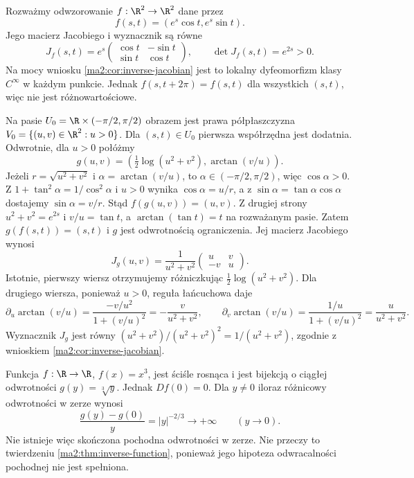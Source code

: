 \begin{przyklad}
\label{ma2:ex:inverse-polar-exponential}
Rozważmy odwzorowanie $f:\R^2\to\R^2$ dane przez
\[
 f(s,t)=(e^s\cos t,e^s\sin t).
\]
Jego macierz Jacobiego i wyznacznik są równe
\[
 J_f(s,t)=e^s
 \begin{pmatrix}\cos t&-\sin t\\\sin t&\cos t\end{pmatrix},
 \qquad \det J_f(s,t)=e^{2s}>0.
\]
Na mocy wniosku \ref{ma2:cor:inverse-jacobian}
jest to lokalny dyfeomorfizm klasy $C^\infty$
w każdym punkcie. Jednak $f(s,t+2\pi)=f(s,t)$
dla wszystkich $(s,t)$, więc nie jest różnowartościowe.

Na pasie $U_0=\R\times(-\pi/2,\pi/2)$ obrazem jest
prawa półpłaszczyzna $V_0=\{(u,v)\in\R^2:u>0\}$.
Dla $(s,t)\in U_0$ pierwsza współrzędna jest dodatnia.
Odwrotnie, dla $u>0$ połóżmy
\[
 g(u,v)=
 \left(\tfrac12\log(u^2+v^2),\arctan(v/u)\right).
\]
Jeżeli $r=\sqrt{u^2+v^2}$ i $\alpha=\arctan(v/u)$,
to $\alpha\in(-\pi/2,\pi/2)$, więc $\cos\alpha>0$.
Z $1+\tan^2\alpha=1/\cos^2\alpha$ i $u>0$ wynika
$\cos\alpha=u/r$, a z $\sin\alpha=\tan\alpha\cos\alpha$
dostajemy $\sin\alpha=v/r$.
Stąd $f(g(u,v))=(u,v)$.
Z drugiej strony $u^2+v^2=e^{2s}$ i $v/u=\tan t$,
a $\arctan(\tan t)=t$ na rozważanym pasie.
Zatem $g(f(s,t))=(s,t)$ i $g$ jest odwrotnością
ograniczenia. Jej macierz Jacobiego wynosi
\[
 J_g(u,v)=\frac{1}{u^2+v^2}
 \begin{pmatrix}u&v\\-v&u\end{pmatrix}.
\]
Istotnie, pierwszy wiersz otrzymujemy różniczkując
$\tfrac12\log(u^2+v^2)$. Dla drugiego wiersza, ponieważ
$u>0$, reguła łańcuchowa daje
\[
 \partial_u\arctan(v/u)=
 \frac{-v/u^2}{1+(v/u)^2}=-\frac{v}{u^2+v^2},
 \qquad
 \partial_v\arctan(v/u)=
 \frac{1/u}{1+(v/u)^2}=\frac{u}{u^2+v^2}.
\]
Wyznacznik $J_g$ jest równy
$(u^2+v^2)/(u^2+v^2)^2=1/(u^2+v^2)$,
zgodnie z wnioskiem \ref{ma2:cor:inverse-jacobian}.
\end{przyklad}

\begin{przyklad}
\label{ma2:ex:inverse-cubic}
Funkcja $f:\R\to\R$, $f(x)=x^3$, jest ściśle
rosnąca i jest bijekcją o ciągłej odwrotności
$g(y)=\sqrt[3]{y}$. Jednak $Df(0)=0$.
Dla $y\ne0$ iloraz różnicowy odwrotności w zerze
wynosi
\[
 \frac{g(y)-g(0)}{y}=|y|^{-2/3}\longrightarrow+\infty
 \qquad(y\to0).
\]
Nie istnieje więc skończona pochodna odwrotności
w zerze. Nie przeczy to twierdzeniu
\ref{ma2:thm:inverse-function}, ponieważ jego
hipoteza odwracalności pochodnej nie jest spełniona.
\end{przyklad}

